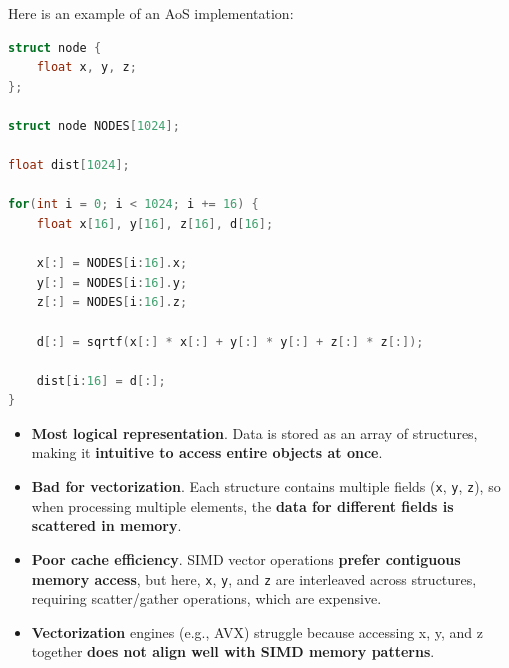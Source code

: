\begin{examplebox}
    Here is an example of an AoS implementation:
    \begin{lstlisting}[language=c++]
struct node {
    float x, y, z;
};

struct node NODES[1024];

float dist[1024];

for(int i = 0; i < 1024; i += 16) {
    float x[16], y[16], z[16], d[16];

    x[:] = NODES[i:16].x;
    y[:] = NODES[i:16].y;
    z[:] = NODES[i:16].z;

    d[:] = sqrtf(x[:] * x[:] + y[:] * y[:] + z[:] * z[:]);

    dist[i:16] = d[:];
}\end{lstlisting}
    \begin{itemize}[label=\textcolor{Red2}{}]
        \item[\textcolor{Green3}{\faIcon{check}}] \textcolor{Green3}{\textbf{Most logical representation}}. Data is stored as an array of structures, making it \textbf{intuitive to access entire objects at once}.
        \item \textcolor{Red2}{\textbf{Bad for vectorization}}. Each structure contains multiple fields (\texttt{x}, \texttt{y}, \texttt{z}), so when processing multiple elements, the \textbf{data for different fields is scattered in memory}.
        \item \textcolor{Red2}{\textbf{Poor cache efficiency}}. SIMD vector operations \textbf{prefer contiguous memory access}, but here, \texttt{x}, \texttt{y}, and \texttt{z} are interleaved across structures, requiring scatter/gather operations, which are expensive.
        \item \textcolor{Red2}{\textbf{Vectorization}} engines (e.g., AVX) struggle because accessing x, y, and z together \textbf{does not align well with SIMD memory patterns}.
    \end{itemize}
\end{examplebox}

\newpage

